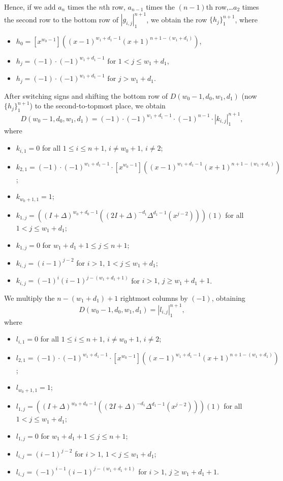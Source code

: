 \documentclass[10pt,reqno]{amsart}
\theoremstyle{plain}
\theoremstyle{definition}
\theoremstyle{remark}
\def\determinant#1{\left|#1\right|}
\begin{document}
Hence, if we add $a_n$ times the $n$th row, $a_{n-1}$ times the
$(n-1)$th row,\dots $a_2$ times the second row to 
the bottom row of $\determinant{g_{i,j}}_1^{n+1}$, we obtain
the row $\{h_j\}_1^{n+1}$, where 
\begin{itemize}
\item $h_0=[x^{w_0-1}]((x-1)^{w_1+d_1-1} (x+1)^{n+1-(w_1+d_1)})$,
\item $h_j = (-1)\cdot (-1)^{w_1+d_1-1} \text{ for } 1<j\leq w_1+d_1$,
\item $h_j = (-1)\cdot (-1)^{w_1+d_1-1} \text{ for } j> w_1+d_1$.
\end{itemize}

After switching signs and shifting the bottom row of
$D(w_0-1,d_0,w_1,d_1)$ (now  $\{h_j\}_1^{n+1}$) to the second-to-topmost
place, we obtain
\begin{equation}
D(w_0-1,d_0,w_1,d_1) = 
(-1)\cdot (-1)^{w_1+d_1-1}\cdot (-1)^{n-1}\cdot
\determinant{k_{i,j}}_1^{n+1},
\end{equation}
where 
\begin{itemize}
\item $k_{i,1} = 0$ for all $1\leq i\leq n+1$, $i\ne w_0+1$, $i\ne 2$;
\item $k_{2,1} = (-1)\cdot (-1)^{w_1+d_1-1}\cdot
[x^{w_0-1}]((x-1)^{w_1+d_1-1} (x+1)^{n+1-(w_1+d_1)})$;
\item $k_{w_0+1,1} = 1$;
\item $k_{1,j} = 
((I+\Delta)^{w_0+d_0-1}((2I+\Delta)^{-d_1}\Delta^{d_1-1}(x^{j-2})))(1)$
for all $1<j\leq w_1+d_1$;
\item $k_{1,j} = 0$ for $w_1+d_1+1\leq j\leq n+1$;
\item $k_{i,j} = (i-1)^{j-2}$ for $i>1$, $1<j\leq w_1+d_1$;
\item $k_{i,j} = (-1)^i (i-1)^{j-(w_1+d_1+1)}$ for $i>1$, $j\geq w_1+d_1+1$.
\end{itemize}

We multiply the $n-(w_1+d_1)+1$ rightmost columns by $(-1)$, obtaining
\begin{equation}
D(w_0-1,d_0,w_1,d_1) = \determinant{l_{i,j}}_1^{n+1},
\end{equation}
where
\begin{itemize}
\item $l_{i,1} = 0$ for all $1\leq i\leq n+1$, $i\ne w_0+1$, $i\ne 2$;
\item $l_{2,1} = (-1)\cdot (-1)^{w_1+d_1-1}\cdot
[x^{w_0-1}]((x-1)^{w_1+d_1-1} (x+1)^{n+1-(w_1+d_1)})$;
\item $l_{w_0+1,1} = 1$;
\item $l_{1,j} = 
((I+\Delta)^{w_0+d_0-1}((2I+\Delta)^{-d_1}\Delta^{d_1-1}(x^{j-2})))(1)$
for all $1<j\leq w_1+d_1$;
\item $l_{1,j} = 0$ for $w_1+d_1+1\leq j\leq n+1$;
\item $l_{i,j} = (i-1)^{j-2}$ for $i>1$, $1<j\leq w_1+d_1$;
\item $l_{i,j} = (-1)^{i-1} (i-1)^{j-(w_1+d_1+1)}$ for $i>1$, $j\geq w_1+d_1+1$.
\end{itemize}
\end{document}
